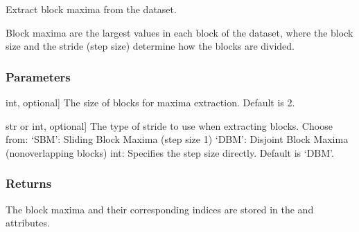 \documentclass[a4paper,11pt,openany,english]{sphinxmanual}
\begin{document}
\begin{fulllineitems}
\begin{fulllineitems}
\end{fulllineitems}


\begin{fulllineitems}
\label{\detokenize{api_topt:xtremes.topt.Data.get_blockmaxima}}
\pysigstartsignatures
{}
\pysigstopsignatures
\sphinxAtStartPar
Extract block maxima from the dataset.

\sphinxAtStartPar
Block maxima are the largest values in each block of the dataset, where the block size 
and the stride (step size) determine how the blocks are divided.


\subsubsection{Parameters}
\label{\detokenize{api_topt:id20}}\begin{description}
\sphinxlineitem{block\_size}{[}int, optional{]}
\sphinxAtStartPar
The size of blocks for maxima extraction. Default is 2.

\sphinxlineitem{stride}{[}str or int, optional{]}
\sphinxAtStartPar
The type of stride to use when extracting blocks. Choose from:
\sphinxhyphen{} ‘SBM’: Sliding Block Maxima (step size 1)
\sphinxhyphen{} ‘DBM’: Disjoint Block Maxima (non\sphinxhyphen{}overlapping blocks)
\sphinxhyphen{} int: Specifies the step size directly.
Default is ‘DBM’.

\end{description}


\subsubsection{Returns}
\label{\detokenize{api_topt:id21}}\begin{description}
\sphinxAtStartPar
The block maxima and their corresponding indices are stored in the  
and  attributes.

\end{description}

\end{fulllineitems}


\end{fulllineitems}
\end{document}
